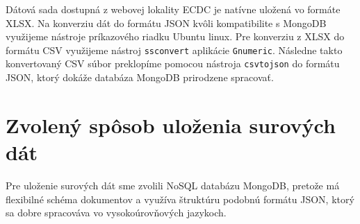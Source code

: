 \documentclass[11pt, a4paper]{article}
\begin{document}
\hfill \break
Dátová sada dostupná z webovej lokality ECDC je natívne uložená vo formáte XLSX. Na konverziu dát do formátu JSON kvôli kompatibilite s MongoDB využijeme nástroje príkazového riadku Ubuntu linux. Pre konverziu z XLSX do formátu CSV využijeme nástroj \texttt{ssconvert} aplikácie \texttt{Gnumeric}. Následne takto konvertovaný CSV súbor preklopíme pomocou nástroja \texttt{csvtojson} do formátu JSON, ktorý dokáže databáza MongoDB prirodzene spracovať.

\section*{Zvolený spôsob uloženia surových dát}
Pre uloženie surových dát sme zvolili NoSQL databázu MongoDB, pretože má flexibilné schéma dokumentov a využíva štruktúru podobnú formátu JSON, ktorý sa dobre spracováva vo vysokoúrovňových jazykoch.
\end{document}
